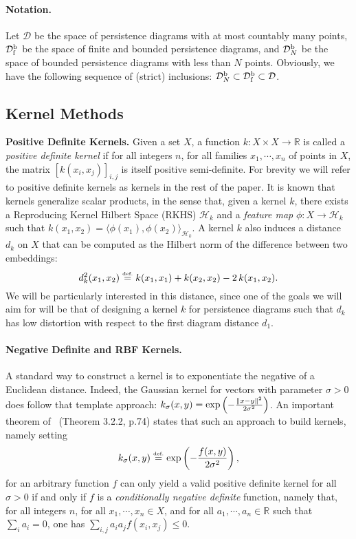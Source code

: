 \documentclass[11pt]{article}
\newcommand{\R}{\mathbb{R}}
\newcommand{\SpD}{{\mathcal D}}
\newcommand{\SpfbD}{{\mathcal D}_{\rm f}^{\rm b}}
\newcommand{\SpND}{{\mathcal D}_N^{\rm b}}
\newcommand{\eqdef}{\ensuremath{\stackrel{\mbox{\upshape\tiny def.}}{=}}}
\begin{document}
\paragraph{Notation.} Let $\SpD$ be the space of persistence diagrams with at most countably many points,
$\SpfbD$ be the space of finite and bounded persistence diagrams, and
$\SpND$ be the space of bounded persistence diagrams with less than $N$ points.
Obviously, we have the following sequence of (strict) inclusions: $\SpND\subset\SpfbD\subset\SpD$.


\subsection{Kernel Methods}
\label{sec:kernelMethods}

\textbf{Positive Definite Kernels.} Given a set $X$, a function $k:X\times X\to\R$ 
is called a {\em positive definite kernel} if for all integers $n$, for all families $x_1,\cdots,x_n$ of points in $X$, 
the matrix $[k(x_i,x_j)]_{i,j}$ is itself positive semi-definite. For brevity we will refer to positive definite 
kernels as kernels in the rest of the paper.
It is known that kernels generalize scalar products, in the sense that, given a kernel $k$, there exists a Reproducing Kernel Hilbert Space
(RKHS) $\mathcal{H}_k$ and a {\em feature map} $\phi:X\to\mathcal{H}_k$ such that $k(x_1,x_2)=\langle \phi(x_1),\phi(x_2)\rangle_{\mathcal{H}_k}$.
A kernel $k$ also induces a distance $d_k$ on $X$ that can be computed as the Hilbert norm of the difference between two embeddings:
$$d_k^2(x_1,x_2)\eqdef k(x_1, x_1) + k(x_2, x_2) -2\,k(x_1, x_2).$$ 
We will be particularly interested in this distance, since one of the goals we will aim for will be that of designing a kernel 
$k$ for persistence diagrams such that $d_k$ has low distortion with respect to the first diagram distance $d_1$.

\paragraph*{Negative Definite and RBF Kernels.} A standard way to construct a kernel is to exponentiate the negative of a 
Euclidean distance. Indeed, the Gaussian kernel for vectors with parameter $\sigma>0$ does follow that template approach: 
$k_\sigma(x,y)={\rm exp}\left(-\frac{\|x-y\|^2}{2\sigma^2}\right)$. An important theorem of~\cite{Berg84} (Theorem 3.2.2, p.74) states that 
such an approach to build kernels, namely setting 
$$k_\sigma(x,y)\eqdef {\rm exp}\left(-\frac{f(x,y)}{2\sigma^2}\right),$$
for an arbitrary function $f$ can only yield a valid positive definite kernel for all $\sigma>0$ 
if and only if $f$ is a \emph{conditionally negative definite} function, namely that, for all integers $n$, 
 for all $x_1,\cdots,x_n \in X$, and for all $ a_1,\cdots,a_n \in \R$ such that $\sum_ia_i=0$, 
one has $\sum_{i,j}a_ia_jf(x_i,x_j)\leq 0$.
\end{document}

